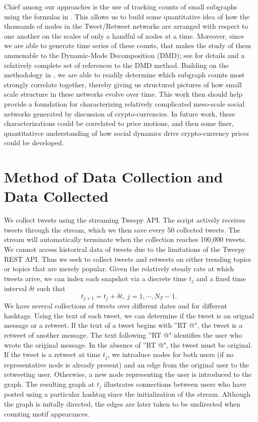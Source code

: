 \documentclass[a4paper,11pt]{article}
\begin{document}
Chief among our approaches is the use of tracking counts of small subgraphs using the formulas in \cite{alon}.  This allows us to build some quantitative idea of how the thousands of nodes in the Tweet/Retweet networks are arranged with respect to one another on the scales of only a handful of nodes at a time.  Moreover, since we are able to generate time series of these counts, that makes the study of them ammenable to the Dynamic-Mode Decomposition (DMD); see \cite{kutz} for details and a relatively complete set of references to the DMD method.  Building on the methodology in \cite{curtis2021detection}, we are able to readily determine which subgraph counts most strongly correlate together, thereby giving us structured pictures of how small scale structure in these networks evolve over time.  This work then should help provide a foundation for characterizing relatively complicated meso-scale social networks generated by discussion of crypto-currencies.  In future work, these characterizations could be correlated to price motions, and then some finer, quantitativce understanding of how social dynamics drive crypto-currency prices could be developed.  
\section{Method of Data Collection and Data Collected}
We collect tweets using the streaming Tweepy API. The script actively receives tweets through the stream, which we then save every 50 collected tweets. The stream will automatically terminate when the collection reaches 100,000 tweets. We cannot access historical data of tweets due to the limitations of the Tweepy REST API. Thus we seek to collect tweets and retweets on either trending topics or topics that are merely popular.  Given the relatively steady rate at which tweets arive, we can index each snapshot via a discrete time $t_{j}$ and a fixed time interval $\delta t$ such that 
\[
t_{j+1} = t_{j} + \delta t, ~ j=1,\cdots, N_{T}-1.
\]
We have several collections of tweets over different dates and for different hashtags. Using the text of each tweet, we can determine if the tweet is an orignal message or a retweet. If the 
text of a tweet begins with ''RT @", the tweet is a retweet of another message. The text following ''RT @" identifies the user who wrote the original message. In the absence of ''RT @", the
tweet must be original. If the tweet is a retweet at time $t_j$, we introduce nodes for both users (if no representative node is already present) and an edge from the original user to the 
retweeting user. Otherwise, a new node representing the user is introduced to the graph. The resulting graph at $t_j$ illustrates connections between users who have posted using a particular
hashtag since the initialization of the stream. Although the graph is initally directed, the edges are later taken to be undirected when counting motif appearances. 
\end{document}
